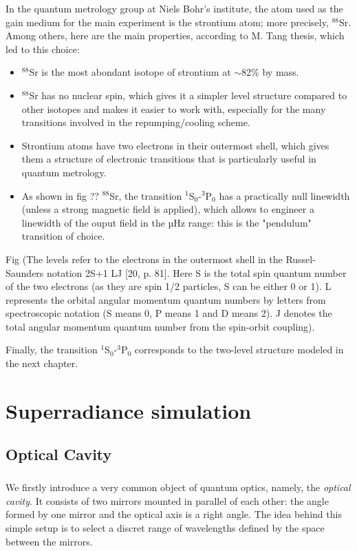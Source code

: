 \documentclass[12pt]{report}
\begin{document}
In the quantum metrology group at Niels Bohr's institute, the atom used as the gain medium for the main experiment is the strontium atom; more precisely, $^{88}$Sr. Among others, here are the main properties, according to M. Tang thesis, which led to this choice:
\begin{itemize}
	\item $^{88}$Sr is the most abondant isotope of strontium at $\sim$82\% by mass.
	\item $^{88}$Sr has no nuclear spin, which gives it a simpler level structure
compared to other isotopes and makes it easier to work with, especially for the many transitions involved in the repumping/cooling scheme.
	\item Strontium atoms have two electrons in their outermost shell, which gives them a structure of electronic transitions that is particularly useful in quantum metrology.
	\item As shown in fig ?? $^{88}$Sr, the transition  $^1$S$_0$-$^3$P$_0$ has a practically null linewidth (unless a strong magnetic field is applied), which allows to engineer a linewidth of the ouput field in the µHz range: this is the "pendulum" transition of choice.
\end{itemize}

Fig (The levels refer to the electrons in the outermost shell in the Russel-Saunders notation 2S+1 LJ [20, p. 81]. Here S is the total spin quantum number of the two electrons (as they are spin 1/2 particles, S can be either 0 or 1). L represents the orbital angular momentum quantum numbers by letters from spectroscopic notation (S means 0, P means 1 and D means 2). J denotes the total angular momentum quantum number from the spin-orbit coupling).

Finally, the transition $^1$S$_0$-$^3$P$_0$ corresponds to the two-level structure modeled in the next chapter.



\chapter{Superradiance simulation}
\section{Optical Cavity}
\paragraph{}
We firstly introduce a very common object of quantum optics, namely, the \textit{optical cavity}. It consists of two mirrors mounted in parallel of each other: the angle formed by one mirror and the optical axis is a right angle. The idea behind this simple setup is to select a discret range of wavelengths defined by the space between the mirrors. 
\end{document}
